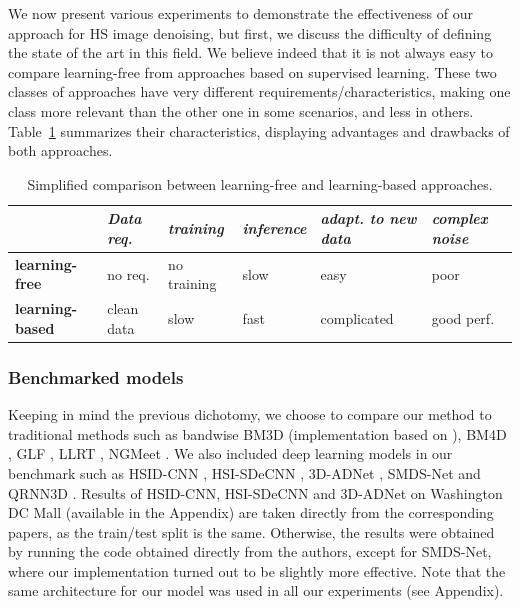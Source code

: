 We now present various experiments to demonstrate the effectiveness of our approach for HS image denoising, but first, we discuss the difficulty of defining the state of the art in this field.  
We believe indeed that it is not always easy to compare learning-free from approaches based on supervised learning.
These two classes of approaches have very different requirements/characteristics, making one class more relevant than the other one in some scenarios, and less in others. 
Table~\ref{table:comp} summarizes their characteristics, displaying advantages and drawbacks of both approaches.
\begin{table}
   \caption{Simplified comparison between learning-free and learning-based approaches.}\label{table:comp}
   \vspace*{0.05cm}
   \centering
\begin{tabular}{llllll}
\toprule
   & \emph{Data req.} & \emph{training} & \emph{inference} &  \emph{adapt. to new data} & \emph{complex noise} \\
                  \hline
   {\bfseries learning-free}  & no req. & no training & slow & easy & poor \\
                  \hline
   {\bfseries learning-based}  & clean data & slow & fast & complicated & good perf. \\
\bottomrule

\end{tabular}
\end{table}

\subsubsection{Benchmarked models}

Keeping in mind the previous dichotomy, we choose to compare our method to traditional methods such as bandwise BM3D \cite{dabov_image_2007} (implementation based on \cite{makinen_exact_2019, makinen_collaborative_2020}), BM4D \cite{maggioni_nonlocal_2013}, GLF \cite{zhuang_hyperspectral_2017}, LLRT \cite{chang_hyper-laplacian_2017}, NGMeet \cite{he_non-local_2020}.
We also included deep learning models in our benchmark such as HSID-CNN \cite{yuan_hyperspectral_2019}, HSI-SDeCNN \cite{maffei_single_2020}, 3D-ADNet \cite{shi_hyperspectral_2021}, SMDS-Net \cite{xiong_smds-net_2020} and QRNN3D \cite{wei_3-d_2020}.
Results of HSID-CNN, HSI-SDeCNN and 3D-ADNet on Washington DC Mall (available in the Appendix) are taken directly from the corresponding papers, as the train/test split is the same.
Otherwise, the results were obtained by running the code obtained directly from the authors, except for SMDS-Net, where our implementation turned out to be slightly more effective.
Note that the same architecture for our model was used in all our experiments (see Appendix).

